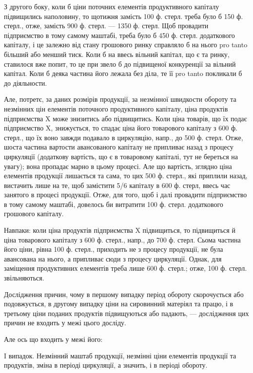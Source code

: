 З другого боку, коли б ціни поточних елементів продуктивного капіталу
підвищились наполовину, то щотижня замість 100 ф. стерл. треба
було б 150 ф. стерл., отже, замість 900 ф. стерл. — 1350 ф. стерл. Щоб
провадити підприємство в тому самому маштабі, треба було б 450 ф.
стерл. додаткового капіталу, і це залежно від стану грошового ринку
справляло б на нього pro tanto більший або менший тиск. Коли б на
ввесь вільний капітал, що є та ринку, ставилося вже попит, то це при
звело б до підвищеної конкуренції за вільний капітал. Коли б деяка частина
його лежала без діла, те її pro tanto покликали б до діяльности.

Але, потретє, за даних розмірів продукції, за незмінної швидкости
обороту та незмінних цін елементів поточного продуктивного капіталу,
ціна продуктів підприємства X може знизитись або підвищитись. Коли
ціна товарів, що їх подає підприємство X, знижується, то спадає ціна
його товарового капіталу з 600 ф. стерл., що їх воно завжди подавало
в циркуляцію, напр., до 500 ф. стерл. Отже, шоста частина вартости авансованого
капіталу не припливає назад з процесу циркуляції (додаткову вартість,
що є в товаровому капіталі, тут не береться на увагу); вона пропадає
марно в цьому процесі. Але що вартість, зглядно ціна елементів продукції
лишається та сама, то цих 500 ф. стерл., які приплили назад, вистачить
лише на те, щоб замістити 5/6 капіталу в 600 ф. стерл, ввесь час
занятого в процесі продукції. Отже, для того, щоб і далі провадити підприємство
в тому самому маштабі, довелось би витратити 100 ф. стерл.
додаткового грошового капіталу.

Навпаки: коли ціна продуктів підприємства X підвищиться, то підвищиться
й ціна товарового капіталу з 600 ф. стерл., напр., до 700 ф.
стерл. Сьома частина його ціни, рівна 100 ф. стерл., приходить не з
процесу продукції, не була авансована на нього, а припливає сюди з
процесу циркуляції. Однак, для заміщення продуктивних елементів треба
лише 600 ф. стерл.; отже, 100 ф. стерл. звільняються.

Дослідження причин, чому в першому випадку період обороту
скорочується або подовжується, в другому випадку ціни на сировинний
матеріял та працю, і в третьому ціни поданих продуктів підвищуються
або падають, — дослідження цих причин не входить у межі цього досліду.

Але ось що входить у межі його:

I випадок. Незмінний маштаб продукції, незмінні ціни елементів
продукції та продуктів, зміна в періоді циркуляції, а значить, і в періоді
обороту.

